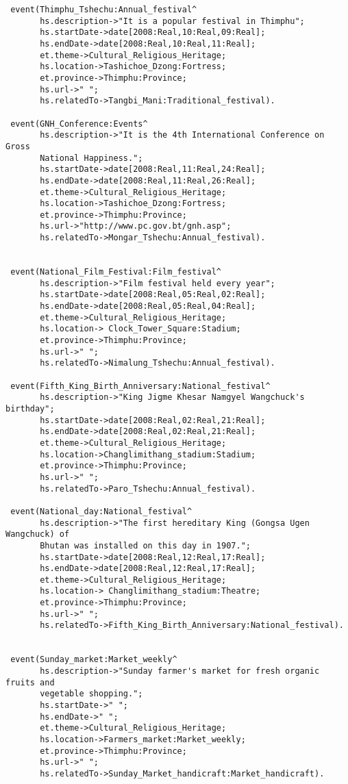 \begin{verbatim}
 event(Thimphu_Tshechu:Annual_festival^
       hs.description->"It is a popular festival in Thimphu";
       hs.startDate->date[2008:Real,10:Real,09:Real];
       hs.endDate->date[2008:Real,10:Real,11:Real];
       et.theme->Cultural_Religious_Heritage;
       hs.location->Tashichoe_Dzong:Fortress;
       et.province->Thimphu:Province;
       hs.url->" ";
       hs.relatedTo->Tangbi_Mani:Traditional_festival).
                      
 event(GNH_Conference:Events^
       hs.description->"It is the 4th International Conference on Gross 
       National Happiness.";
       hs.startDate->date[2008:Real,11:Real,24:Real];
       hs.endDate->date[2008:Real,11:Real,26:Real];
       et.theme->Cultural_Religious_Heritage;
       hs.location->Tashichoe_Dzong:Fortress;
       et.province->Thimphu:Province;
       hs.url->"http://www.pc.gov.bt/gnh.asp";
       hs.relatedTo->Mongar_Tshechu:Annual_festival).


 event(National_Film_Festival:Film_festival^
       hs.description->"Film festival held every year";
       hs.startDate->date[2008:Real,05:Real,02:Real];
       hs.endDate->date[2008:Real,05:Real,04:Real];
       et.theme->Cultural_Religious_Heritage;
       hs.location-> Clock_Tower_Square:Stadium;
       et.province->Thimphu:Province;
       hs.url->" ";
       hs.relatedTo->Nimalung_Tshechu:Annual_festival).

 event(Fifth_King_Birth_Anniversary:National_festival^
       hs.description->"King Jigme Khesar Namgyel Wangchuck's birthday";
       hs.startDate->date[2008:Real,02:Real,21:Real];
       hs.endDate->date[2008:Real,02:Real,21:Real];
       et.theme->Cultural_Religious_Heritage;
       hs.location->Changlimithang_stadium:Stadium;
       et.province->Thimphu:Province;
       hs.url->" ";
       hs.relatedTo->Paro_Tshechu:Annual_festival).

 event(National_day:National_festival^
       hs.description->"The first hereditary King (Gongsa Ugen Wangchuck) of 
       Bhutan was installed on this day in 1907.";
       hs.startDate->date[2008:Real,12:Real,17:Real];
       hs.endDate->date[2008:Real,12:Real,17:Real];
       et.theme->Cultural_Religious_Heritage;
       hs.location-> Changlimithang_stadium:Theatre;
       et.province->Thimphu:Province;
       hs.url->" ";
       hs.relatedTo->Fifth_King_Birth_Anniversary:National_festival).


 event(Sunday_market:Market_weekly^
       hs.description->"Sunday farmer's market for fresh organic fruits and 
       vegetable shopping.";
       hs.startDate->" ";
       hs.endDate->" ";
       et.theme->Cultural_Religious_Heritage;
       hs.location->Farmers_market:Market_weekly;
       et.province->Thimphu:Province;
       hs.url->" ";
       hs.relatedTo->Sunday_Market_handicraft:Market_handicraft).


\end{verbatim}
